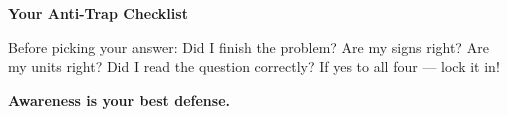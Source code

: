 {\vspace{3mm}

\begin{tcolorbox}[
    enhanced,
    colback=funYellowLight,
    colframe=funYellow!60,
    arc=10pt,
    boxrule=1pt,
    left=6mm, right=6mm, top=4mm, bottom=4mm,
]
{\bfseries\color{funYellowDark} \faLightbulb\hspace{2mm}Your Anti-Trap Checklist}

\vspace{2mm}

Before picking your answer: Did I finish the problem? Are my signs right? Are my units right? Did I read the question correctly? If yes to all four — lock it in!
\end{tcolorbox}

\vspace{4mm}

\begin{center}
{\large\bfseries\color{funGreenDark} \faShieldAlt\hspace{2mm}Awareness is your best defense.\hspace{2mm}\faShieldAlt}
\end{center}

}
\newpage
